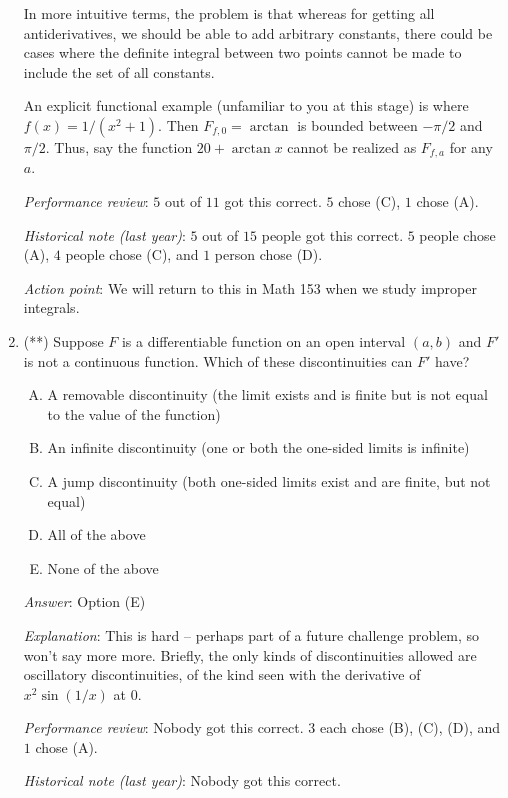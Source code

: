 \documentclass[10pt]{amsart}
\begin{document}
\begin{enumerate}
  In more intuitive terms, the problem is that whereas for getting all
  antiderivatives, we should be able to add arbitrary constants, there
  could be cases where the definite integral between two points cannot
  be made to include the set of all constants.

  An explicit functional example (unfamiliar to you at this stage) is
  where $f(x) = 1/(x^2 + 1)$. Then $F_{f,0} = \arctan$ is bounded
  between $-\pi/2$ and $\pi/2$. Thus, say the function $20 + \arctan
  x$ cannot be realized as $F_{f,a}$ for any $a$.

  {\em Performance review}: $5$ out of $11$ got this correct. $5$
  chose (C), $1$ chose (A).

  {\em Historical note (last year)}: $5$ out of $15$ people got this
  correct. $5$ people chose (A), $4$ people chose (C), and $1$ person
  chose (D).

  {\em Action point}: We will return to this in Math 153 when we study
  improper integrals.

\item (**) Suppose $F$ is a differentiable function on an open interval
  $(a,b)$ and $F'$ is not a continuous function. Which of these
  discontinuities can $F'$ have?

  \begin{enumerate}[(A)]
  \item A removable discontinuity (the limit exists and is finite but
    is not equal to the value of the function)
  \item An infinite discontinuity (one or both the one-sided limits is
    infinite)
  \item A jump discontinuity (both one-sided limits exist and are
    finite, but not equal)
  \item All of the above
  \item None of the above
  \end{enumerate}
  
  {\em Answer}: Option (E)

  {\em Explanation}: This is hard -- perhaps part of a future
  challenge problem, so won't say more more. Briefly, the only kinds
  of discontinuities allowed are oscillatory discontinuities, of the
  kind seen with the derivative of $x^2\sin (1/x)$ at $0$.

  {\em Performance review}: Nobody got this correct. $3$ each chose
  (B), (C), (D), and $1$ chose (A).

  {\em Historical note (last year)}: Nobody got this correct.
\end{enumerate}
\end{document}
